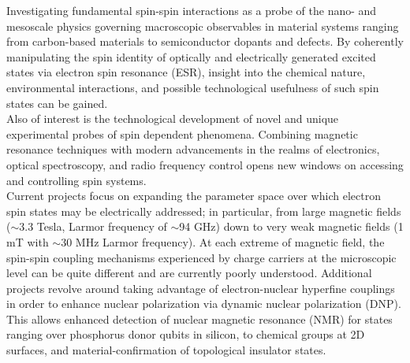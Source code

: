 \documentclass[11pt,letterpaper]{article}
\newcommand{\mhead}[1]{\leavevmode\marginpar{\sffamily\small #1}}
\begin{document}
\mhead{Research \newline Interests}%
Investigating fundamental spin-spin interactions as a probe of the nano- and mesoscale physics governing macroscopic observables in material systems ranging from carbon-based materials to semiconductor dopants and defects. By coherently manipulating the spin identity of optically and electrically generated excited states via electron spin resonance (ESR), insight into the chemical nature, environmental interactions, and possible technological usefulness of such spin states can be gained.
\\[5pt]
Also of interest is the technological development of novel and unique experimental probes of spin dependent phenomena. Combining magnetic resonance techniques with modern advancements in the realms of electronics, optical spectroscopy, and radio frequency control opens new windows on accessing and controlling spin systems.
\\[5pt]
Current projects focus on expanding the parameter space over which electron spin states may be electrically addressed; in particular, from large magnetic fields ($\sim$3.3 Tesla, Larmor frequency of $\sim$94 GHz) down to very weak magnetic fields (1 mT with $\sim$30 MHz Larmor frequency). At each extreme of magnetic field, the spin-spin coupling mechanisms experienced by charge carriers at the microscopic level can be quite different and are currently poorly understood. Additional projects revolve around taking advantage of electron-nuclear hyperfine couplings in order to enhance nuclear polarization via dynamic nuclear polarization (DNP). This allows enhanced detection of nuclear magnetic resonance (NMR) for states ranging over phosphorus donor qubits in silicon, to chemical groups at 2D surfaces, and material-confirmation of topological insulator states.
\vspace{0.4\baselineskip} %
\end{document}
